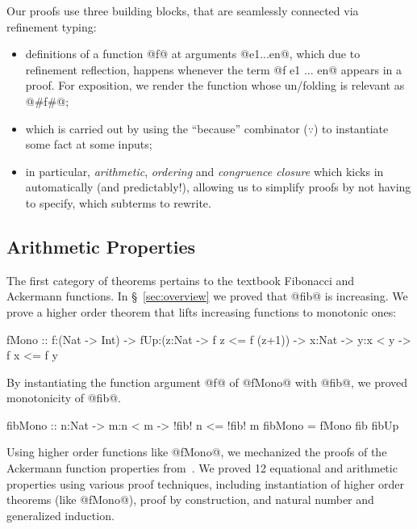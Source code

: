 %
Our proofs use three building blocks, that are seamlessly
connected via refinement typing:
%
\begin{itemize}
  \item {}
     definitions of a function @f@ at
     arguments @e1...en@, which due
     to refinement reflection, happens
     whenever the term @f e1 ... en@
     appears in a proof.
     For exposition, we render the function
     whose un/folding is relevant as @#f#@;
%
  \item {}
     which is carried out by using
     the ``because'' combinator
     ($\because$) to instantiate
     some fact at some inputs;
%
  \item {}
     in particular, \emph{arithmetic},
     \emph{ordering} and \emph{congruence closure}
     which kicks in automatically (and predictably!),
     allowing us to simplify proofs by not
     having to specify, \eg which subterms
     to rewrite.
\end{itemize}

\subsection{Arithmetic Properties} \label{subsec:arith} \label{subsec:ackermann}

The first category of theorems pertains to the textbook
Fibonacci and Ackermann functions.
%
In \S~\ref{sec:overview} we proved that @fib@ is increasing.
%
We prove a higher order theorem that lifts increasing functions
to monotonic ones:
%
\begin{mcode}
  fMono :: f:(Nat -> Int) -> fUp:(z:Nat -> {f z <= f (z+1)}) -> x:Nat -> y:{x < y} -> {f x <= f y}
\end{mcode}
%
By instantiating the function argument @f@ of @fMono@ with
@fib@, we proved monotonicity of @fib@.
%
\begin{mcode}
  fibMono :: n:Nat -> m:{n < m} -> {!fib! n <= !fib! m}
  fibMono = fMono fib fibUp
\end{mcode}
%
Using higher order functions like @fMono@,
we mechanized the proofs of the Ackermann function
properties from~\cite{ackermann}.
%
We proved 12 equational and arithmetic properties using various
proof techniques, including
instantiation of higher order theorems (like @fMono@),
proof by construction, and
natural number and generalized induction.


